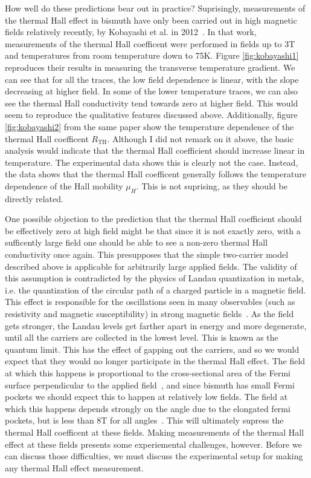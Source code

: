 \documentclass{thesis-umich}
\begin{document}
How well do these predictions bear out in practice? Suprisingly, measurements of the thermal Hall effect in bismuth have only been carried out in high magnetic fields relatively recently, by Kobayashi et al. in 2012~\cite{Kobayashi2012}. In that work, measurements of the thermal Hall coefficent were performed in fields up to 3T and temperatures from room temperature down to 75K. Figure \ref{fig:kobayashi1} reproduces their results in measuring the transverse temperature gradient. We can see that for all the traces, the low field dependence is linear, with the slope decreasing at higher field. In some of the lower temperature traces, we can also see the thermal Hall conductivity tend towards zero at higher field. This would seem to reproduce the qualitative features discussed above. Additionally, figure \ref{fig:kobayashi2} from the same paper show the temperature dependence of the thermal Hall coefficent $R_{\mathrm{TH}}$. Although I did not remark on it above, the basic analysis would indicate that the thermal Hall coefficient should increase linear in temperature. The experimental data shows this is clearly not the case. Instead, the data shows that the thermal Hall coefficent generally follows the temperature dependence of the Hall mobility $\mu_H$. This is not suprising, as they should be directly related.

One possible objection to the prediction that the thermal Hall coefficient should be effectively zero at high field might be that since it is not exactly zero, with a sufficently large field one should be able to see a non-zero thermal Hall conductivity once again. This presupposes that the simple two-carrier model described above is applicable for arbitrarily large applied fields. The validity of this assumption is contradicted by the physics of Landau quantization in metals, i.e. the quantization of the circular path of a charged particle in a magnetic field. This effect is responsible for the oscillations seen in many observables (such as resistivity and magnetic susceptibility) in strong magnetic fields~\cite{Shoenberg}. As the field gets stronger, the Landau levels get farther apart in energy and more degenerate, until all the carriers are collected in the lowest level. This is known as the quantum limit. This has the effect of gapping out the carriers, and so we would expect that they would no longer participate in the thermal Hall effect. The field at which this happens is proportional to the cross-sectional area of the Fermi surface perpendicular to the applied field~\cite{Shoenberg}, and since bismuth has small Fermi pockets we should expect this to happen at relatively low fields. The field at which this happens depends strongly on the angle due to the elongated fermi pockets, but is less than 8T for all angles~\cite{Li2008}. This will ultimately supress the thermal Hall coefficent at these fields. Making measurements of the thermal Hall effect at these fields presents some experiemental challenges, however. Before we can discuss those difficulties, we must discuss the experimental setup for making any thermal Hall effect measurement.  
\end{document}
